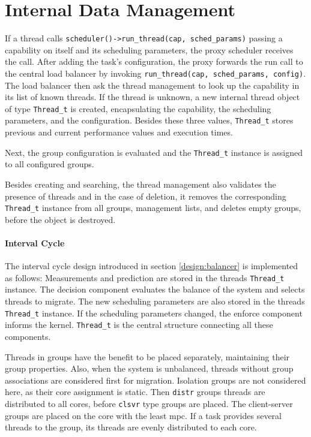 \section{Internal Data Management}
\label{impl:internal}

If a thread calls \texttt{scheduler()->run\_thread(cap, sched\_params)} passing
a capability on itself and its scheduling parameters, the proxy scheduler
receives the call.
After adding the task's configuration, the proxy forwards the run call to the
central load balancer by invoking \texttt{run\_thread(cap, sched\_params, config)}.
The load balancer then ask the thread management to look up the capability in
its list of known threads.
If the thread is unknown, a new internal thread object of type
\texttt{Thread\_t} is created, encapsulating the capability, the scheduling
parameters, and the configuration.
Besides these three values, \texttt{Thread\_t} stores previous and current
performance values and execution times.

Next, the group configuration is evaluated and the \texttt{Thread\_t} instance
is assigned to all configured groups.

Besides creating and searching, the thread management also validates the
presence of threads and in the case of deletion, it removes the corresponding
\texttt{Thread\_t} instance from all groups, management lists, and deletes empty
groups, before the object is destroyed.


\paragraph{Interval Cycle}
The interval cycle design introduced in section \ref{design:balancer} is
implemented as follows:
Measurements and prediction are stored in the threads \texttt{Thread\_t}
instance.
The decision component evaluates the balance of the system and selects threads
to migrate.
The new scheduling parameters are also stored in the threads \texttt{Thread\_t}
instance.
If the scheduling parameters changed, the enforce component informs the kernel.
\texttt{Thread\_t} is the central structure connecting all these components.

Threads in groups have the benefit to be placed separately, maintaining their
group properties.
Also, when the system is unbalanced, threads without group associations are
considered first for migration.
Isolation groups are not considered here, as their core assignment is static.
Then \texttt{distr} groups threads are distributed to all cores, before
\texttt{clsvr} type groups are placed.
The client-server groups are placed on the core with the least \gls{mpc}.
If a task provides several threads to the group, its threads are evenly
distributed to each core.

